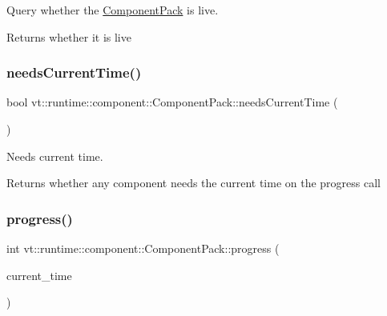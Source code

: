 Query whether the {\ttfamily \hyperlink{structvt_1_1runtime_1_1component_1_1_component_pack}{Component\+Pack}} is live. 

\begin{DoxyReturn}{Returns}
whether it is live 
\end{DoxyReturn}
\mbox{\label{structvt_1_1runtime_1_1component_1_1_component_pack_aa220df4ce14324ef3580f309f5edd345}} 
\subsubsection{\texorpdfstring{needs\+Current\+Time()}{needsCurrentTime()}}
{\footnotesize\ttfamily bool vt\+::runtime\+::component\+::\+Component\+Pack\+::needs\+Current\+Time (\begin{DoxyParamCaption}{ }\end{DoxyParamCaption})}



Needs current time. 

\begin{DoxyReturn}{Returns}
whether any component needs the current time on the progress call 
\end{DoxyReturn}
\mbox{\label{structvt_1_1runtime_1_1component_1_1_component_pack_a618c94b245df9fa59979ecfb116866c2}} 
\subsubsection{\texorpdfstring{progress()}{progress()}}
{\footnotesize\ttfamily int vt\+::runtime\+::component\+::\+Component\+Pack\+::progress (\begin{DoxyParamCaption}\item[{\hyperlink{namespacevt_a2b9f28078dc309ad0706b69ded743e69}{Time\+Type}}]{current\+\_\+time }\end{DoxyParamCaption})}



